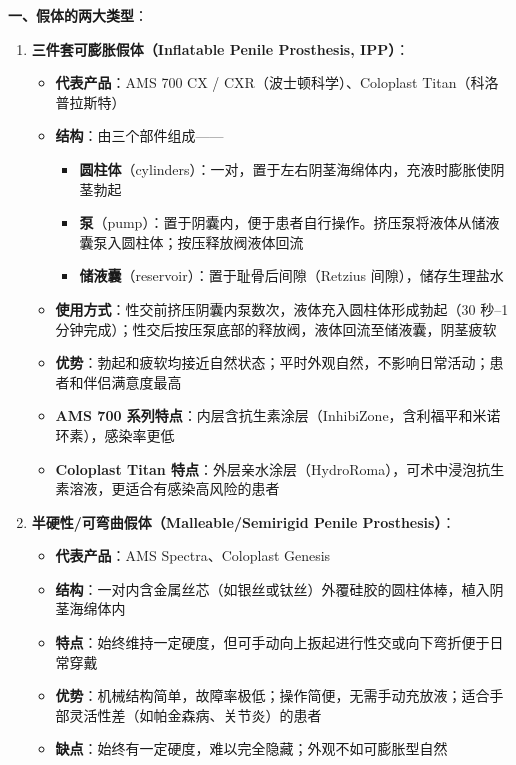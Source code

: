 \documentclass[12pt,a4paper,twoside]{ctexbook}
\begin{document}
\vspace{0.5em}
\noindent\textbf{一、假体的两大类型}：

\begin{enumerate}
	\item \textbf{三件套可膨胀假体（Inflatable Penile Prosthesis, IPP）}：
	\begin{itemize}
		\item \textbf{代表产品}：AMS 700 CX / CXR（波士顿科学）、Coloplast Titan（科洛普拉斯特）
		\item \textbf{结构}：由三个部件组成——
		\begin{itemize}
			\item \textbf{圆柱体}（cylinders）：一对，置于左右阴茎海绵体内，充液时膨胀使阴茎勃起
			\item \textbf{泵}（pump）：置于阴囊内，便于患者自行操作。挤压泵将液体从储液囊泵入圆柱体；按压释放阀液体回流
			\item \textbf{储液囊}（reservoir）：置于耻骨后间隙（Retzius 间隙），储存生理盐水
		\end{itemize}
		\item \textbf{使用方式}：性交前挤压阴囊内泵数次，液体充入圆柱体形成勃起（30 秒--1 分钟完成）；性交后按压泵底部的释放阀，液体回流至储液囊，阴茎疲软
		\item \textbf{优势}：勃起和疲软均接近自然状态；平时外观自然，不影响日常活动；患者和伴侣满意度最高
		\item \textbf{AMS 700 系列特点}：内层含抗生素涂层（InhibiZone，含利福平和米诺环素），感染率更低
		\item \textbf{Coloplast Titan 特点}：外层亲水涂层（HydroRoma），可术中浸泡抗生素溶液，更适合有感染高风险的患者
	\end{itemize}

	\item \textbf{半硬性/可弯曲假体（Malleable/Semirigid Penile Prosthesis）}：
	\begin{itemize}
		\item \textbf{代表产品}：AMS Spectra、Coloplast Genesis
		\item \textbf{结构}：一对内含金属丝芯（如银丝或钛丝）外覆硅胶的圆柱体棒，植入阴茎海绵体内
		\item \textbf{特点}：始终维持一定硬度，但可手动向上扳起进行性交或向下弯折便于日常穿戴
		\item \textbf{优势}：机械结构简单，故障率极低；操作简便，无需手动充放液；适合手部灵活性差（如帕金森病、关节炎）的患者
		\item \textbf{缺点}：始终有一定硬度，难以完全隐藏；外观不如可膨胀型自然
	\end{itemize}
\end{enumerate}
\end{document}
